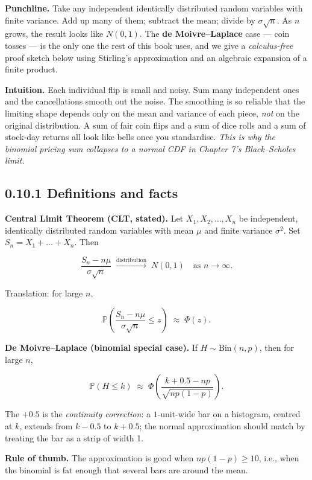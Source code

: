 \documentclass[
  10pt,
  twoside]{book}
\begin{document}
\textbf{Punchline.} Take any independent identically distributed random
variables with finite variance. Add up many of them; subtract the mean;
divide by \(\sigma\sqrt{n}\). As \(n\) grows, the result looks like
\(N(0, 1)\). The \textbf{de Moivre--Laplace} case --- coin tosses --- is
the only one the rest of this book uses, and we give a
\emph{calculus-free} proof sketch below using Stirling's approximation
and an algebraic expansion of a finite product.

\textbf{Intuition.} Each individual flip is small and noisy. Sum many
independent ones and the cancellations smooth out the noise. The
smoothing is so reliable that the limiting shape depends only on the
mean and variance of each piece, \emph{not} on the original
distribution. A sum of fair coin flips and a sum of dice rolls and a sum
of stock-day returns all look like bells once you standardise.
\emph{This is why the binomial pricing sum collapses to a normal CDF in
Chapter 7's Black--Scholes limit.}

\subsection{0.10.1 Definitions and facts}\label{definitions-and-facts-1}

\textbf{Central Limit Theorem (CLT, stated).} Let
\(X_1, X_2, \dots, X_n\) be independent, identically distributed random
variables with mean \(\mu\) and finite variance \(\sigma^2\). Set
\(S_n = X_1 + \dots + X_n\). Then

\[\frac{S_n - n\mu}{\sigma \sqrt{n}} \;\xrightarrow{\text{distribution}}\; N(0, 1) \quad \text{as } n \to \infty.\]

Translation: for large \(n\),

\[\mathbb{P}\!\left(\frac{S_n - n\mu}{\sigma \sqrt{n}} \leq z\right) \;\approx\; \Phi(z).\]

\textbf{De Moivre--Laplace (binomial special case).} If
\(H \sim \mathrm{Bin}(n, p)\), then for large \(n\),

\[\mathbb{P}(H \leq k) \;\approx\; \Phi\!\left(\frac{k + 0.5 - np}{\sqrt{np(1-p)}}\right).\]

The \(+0.5\) is the \emph{continuity correction}: a \(1\)-unit-wide bar
on a histogram, centred at \(k\), extends from \(k - 0.5\) to
\(k + 0.5\); the normal approximation should match by treating the bar
as a strip of width 1.

\textbf{Rule of thumb.} The approximation is good when
\(np(1-p) \geq 10\), i.e., when the binomial is fat enough that several
bars are around the mean.
\end{document}
